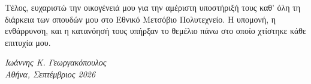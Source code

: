 \documentclass[diploma]{softlab-thesis}
\begin{document}
\begin{acknowledgementsgr}
Τέλος, ευχαριστώ την οικογένειά μου για την αμέριστη υποστήριξή τους καθ' όλη τη διάρκεια των σπουδών μου στο Εθνικό Μετσόβιο Πολυτεχνείο. Η υπομονή, η ενθάρρυνση, και η κατανόησή τους υπήρξαν το θεμέλιο πάνω στο οποίο χτίστηκε κάθε επιτυχία μου.

\vspace{1cm}
\begin{flushright}
\textit{Ιωάννης Κ. Γεωργακόπουλος}\\
\textit{Αθήνα, Σεπτέμβριος 2026}
\end{flushright}


\end{acknowledgementsgr}



\tableofcontents
\listoftables
\listoffigures



\mainmatter















\end{document}
